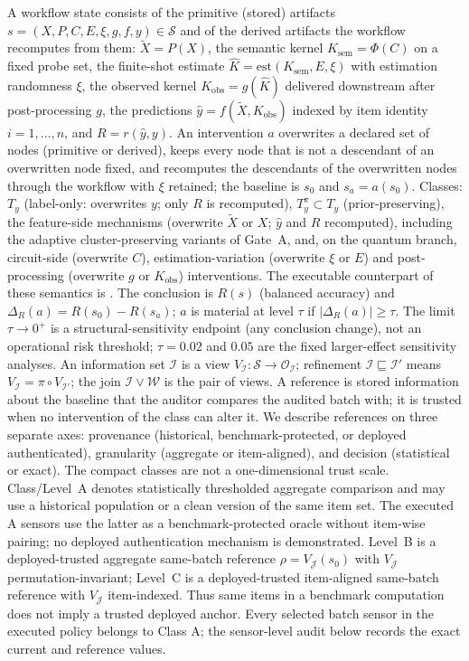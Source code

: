 \documentclass[10pt,journal,compsoc]{IEEEtran}
\begin{document}
A workflow state consists of the primitive (stored) artifacts
$s=(X,P,C,E,\xi,g,f,y)\in\mathcal S$ and of the derived artifacts the
workflow recomputes from them: $\tilde X=P(X)$, the semantic kernel
$K_{\mathrm{sem}}=\Phi(C)$ on a fixed probe set, the finite-shot estimate
$\hat K=\mathrm{est}(K_{\mathrm{sem}},E,\xi)$ with estimation randomness
$\xi$, the observed kernel $K_{\mathrm{obs}}=g(\hat K)$ delivered downstream
after post-processing $g$, the predictions $\hat y=f(\tilde X,K_{\mathrm{obs}})$
indexed by item identity $i=1,\dots,n$, and $R=r(\hat y,y)$. An intervention
$a$ overwrites a declared set of nodes (primitive or derived), keeps every
node that is not a descendant of an overwritten node fixed, and recomputes
the descendants of the overwritten nodes through the workflow with $\xi$
retained; the baseline is $s_0$ and $s_a=a(s_0)$. Classes: $T_y$
(label-only: overwrites $y$; only $R$ is recomputed), $T_y^{\pi}\subset T_y$
(prior-preserving), the feature-side mechanisms (overwrite $\tilde X$ or
$X$; $\hat y$ and $R$ recomputed), including the adaptive cluster-preserving
variants of Gate~A, and, on the quantum branch, circuit-side (overwrite $C$),
estimation-variation (overwrite $\xi$ or $E$) and post-processing (overwrite
$g$ or $K_{\mathrm{obs}}$) interventions. The executable counterpart of
these semantics is . The conclusion
is $R(s)$ (balanced accuracy) and $\Delta_R(a)=R(s_0)-R(s_a)$; $a$ is
material at level $\tau$ if $|\Delta_R(a)|\ge\tau$. The limit
$\tau\to0^{+}$ is a structural-sensitivity endpoint (any conclusion change),
not an operational risk threshold; $\tau=0.02$ and $0.05$ are the fixed
larger-effect sensitivity analyses. An information set
$\mathcal I$ is a view $V_{\mathcal I}:\mathcal S\to\mathcal O_{\mathcal I}$;
refinement $\mathcal I\sqsubseteq\mathcal I'$ means
$V_{\mathcal I}=\pi\circ V_{\mathcal I'}$; the join $\mathcal I\vee\mathcal W$
is the pair of views. A reference is stored information about the baseline
that the auditor compares the audited batch with; it is trusted when no
intervention of the class can alter it. We describe references on three
separate axes: provenance (historical, benchmark-protected, or deployed
authenticated), granularity (aggregate or item-aligned), and decision
(statistical or exact). The compact classes are not a one-dimensional trust
scale. Class/Level~A denotes statistically thresholded aggregate comparison
and may use a historical population or a clean version of the same item set.
The executed A sensors use the latter as a benchmark-protected oracle without
item-wise pairing; no deployed authentication mechanism is demonstrated.
Level~B is a deployed-trusted aggregate same-batch reference
$\rho=V_{\mathcal J}(s_0)$ with $V_{\mathcal J}$ permutation-invariant;
Level~C is a deployed-trusted item-aligned same-batch reference with
$V_{\mathcal J}$ item-indexed. Thus same items in a benchmark computation
does not imply a trusted deployed anchor. Every selected batch sensor in the
executed policy belongs to Class A; the sensor-level audit below records the
exact current and reference values.
\end{document}
